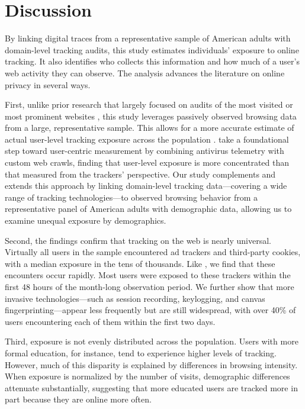 \documentclass[12pt, letterpaper]{article}
\begin{document}
\section{Discussion}
\label{sec:discussion}

By linking digital traces from a representative sample of American adults with domain-level tracking audits, this study estimates individuals' exposure to online tracking. It also identifies who collects this information and how much of a user's web activity they can observe. The analysis advances the literature on online privacy in several ways.

First, unlike prior research that largely focused on audits of the most visited or most prominent websites \citep{Englehardt2016, karaj2018whotracks, blacklight, niforatos2021prevalence, SanchezRola2018, SanchezRola2021, zheutlin2021data, zheutlin2022data}, this study leverages passively observed browsing data from a large, representative sample.
This allows for a more accurate estimate of actual user-level tracking exposure across the population \citep{Dambra2022}.
\citet{Dambra2022} take a foundational step toward user-centric measurement by combining antivirus telemetry with custom web crawls, finding that user-level exposure is more concentrated than that measured from the trackers' perspective.
Our study complements and extends this approach by linking domain-level tracking data---covering a wide range of tracking technologies---to observed browsing behavior from a representative panel of American adults with demographic data, allowing us to examine unequal exposure by demographics.

Second, the findings confirm that tracking on the web is nearly universal.
Virtually all users in the sample encountered ad trackers and third-party cookies, with a median exposure in the tens of thousands. Like \cite{Dambra2022}, we find that these encounters occur rapidly.
Most users were exposed to these trackers within the first 48 hours of the month-long observation period. We further show that more invasive technologies---such as session recording, keylogging, and canvas fingerprinting---appear less frequently but are still widespread, with over 40\% of users encountering each of them within the first two days.

Third, exposure is not evenly distributed across the population. Users with more formal education, for instance, tend to experience higher levels of tracking. However, much of this disparity is explained by differences in browsing intensity. When exposure is normalized by the number of visits, demographic differences attenuate substantially, suggesting that more educated users are tracked more in part because they are online more often.
\end{document}
